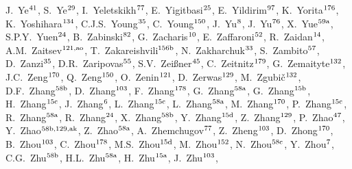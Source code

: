 \begin{flushleft}
J.~Ye$^\textrm{\scriptsize 41}$,    
S.~Ye$^\textrm{\scriptsize 29}$,    
I.~Yeletskikh$^\textrm{\scriptsize 77}$,    
E.~Yigitbasi$^\textrm{\scriptsize 25}$,    
E.~Yildirim$^\textrm{\scriptsize 97}$,    
K.~Yorita$^\textrm{\scriptsize 176}$,    
K.~Yoshihara$^\textrm{\scriptsize 134}$,    
C.J.S.~Young$^\textrm{\scriptsize 35}$,    
C.~Young$^\textrm{\scriptsize 150}$,    
J.~Yu$^\textrm{\scriptsize 8}$,    
J.~Yu$^\textrm{\scriptsize 76}$,    
X.~Yue$^\textrm{\scriptsize 59a}$,    
S.P.Y.~Yuen$^\textrm{\scriptsize 24}$,    
B.~Zabinski$^\textrm{\scriptsize 82}$,    
G.~Zacharis$^\textrm{\scriptsize 10}$,    
E.~Zaffaroni$^\textrm{\scriptsize 52}$,    
R.~Zaidan$^\textrm{\scriptsize 14}$,    
A.M.~Zaitsev$^\textrm{\scriptsize 121,ao}$,    
T.~Zakareishvili$^\textrm{\scriptsize 156b}$,    
N.~Zakharchuk$^\textrm{\scriptsize 33}$,    
S.~Zambito$^\textrm{\scriptsize 57}$,    
D.~Zanzi$^\textrm{\scriptsize 35}$,    
D.R.~Zaripovas$^\textrm{\scriptsize 55}$,    
S.V.~Zei{\ss}ner$^\textrm{\scriptsize 45}$,    
C.~Zeitnitz$^\textrm{\scriptsize 179}$,    
G.~Zemaityte$^\textrm{\scriptsize 132}$,    
J.C.~Zeng$^\textrm{\scriptsize 170}$,    
Q.~Zeng$^\textrm{\scriptsize 150}$,    
O.~Zenin$^\textrm{\scriptsize 121}$,    
D.~Zerwas$^\textrm{\scriptsize 129}$,    
M.~Zgubi\v{c}$^\textrm{\scriptsize 132}$,    
D.F.~Zhang$^\textrm{\scriptsize 58b}$,    
D.~Zhang$^\textrm{\scriptsize 103}$,    
F.~Zhang$^\textrm{\scriptsize 178}$,    
G.~Zhang$^\textrm{\scriptsize 58a}$,    
G.~Zhang$^\textrm{\scriptsize 15b}$,    
H.~Zhang$^\textrm{\scriptsize 15c}$,    
J.~Zhang$^\textrm{\scriptsize 6}$,    
L.~Zhang$^\textrm{\scriptsize 15c}$,    
L.~Zhang$^\textrm{\scriptsize 58a}$,    
M.~Zhang$^\textrm{\scriptsize 170}$,    
P.~Zhang$^\textrm{\scriptsize 15c}$,    
R.~Zhang$^\textrm{\scriptsize 58a}$,    
R.~Zhang$^\textrm{\scriptsize 24}$,    
X.~Zhang$^\textrm{\scriptsize 58b}$,    
Y.~Zhang$^\textrm{\scriptsize 15d}$,    
Z.~Zhang$^\textrm{\scriptsize 129}$,    
P.~Zhao$^\textrm{\scriptsize 47}$,    
Y.~Zhao$^\textrm{\scriptsize 58b,129,ak}$,    
Z.~Zhao$^\textrm{\scriptsize 58a}$,    
A.~Zhemchugov$^\textrm{\scriptsize 77}$,    
Z.~Zheng$^\textrm{\scriptsize 103}$,    
D.~Zhong$^\textrm{\scriptsize 170}$,    
B.~Zhou$^\textrm{\scriptsize 103}$,    
C.~Zhou$^\textrm{\scriptsize 178}$,    
M.S.~Zhou$^\textrm{\scriptsize 15d}$,    
M.~Zhou$^\textrm{\scriptsize 152}$,    
N.~Zhou$^\textrm{\scriptsize 58c}$,    
Y.~Zhou$^\textrm{\scriptsize 7}$,    
C.G.~Zhu$^\textrm{\scriptsize 58b}$,    
H.L.~Zhu$^\textrm{\scriptsize 58a}$,    
H.~Zhu$^\textrm{\scriptsize 15a}$,    
J.~Zhu$^\textrm{\scriptsize 103}$,    

\end{flushleft}
